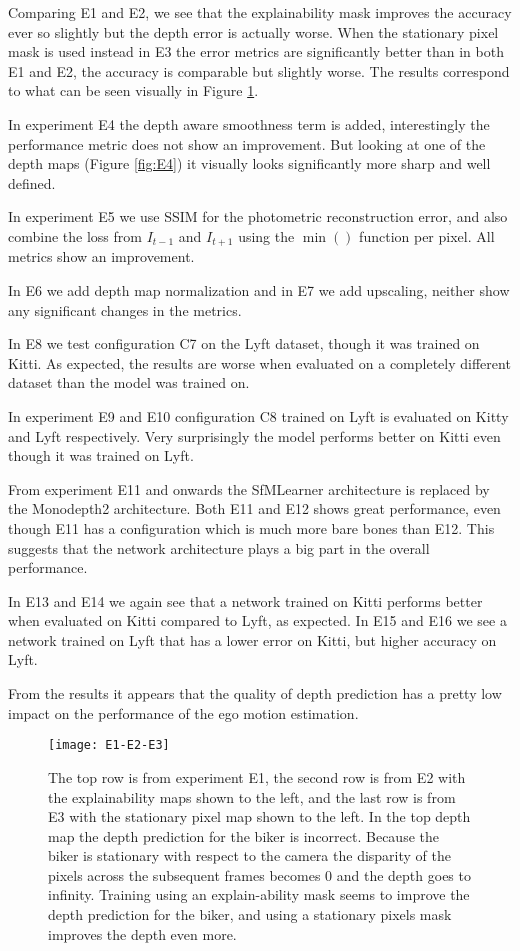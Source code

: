 Comparing E1 and E2, we see that the explainability mask improves the accuracy ever so slightly but the depth error is actually worse. When the stationary pixel mask is used instead in E3 the error metrics are significantly better than in both E1 and E2, the accuracy is comparable but slightly worse. The results correspond to what can be seen visually in Figure \ref{fig:e1e2e3}.

In experiment E4 the depth aware smoothness term is added, interestingly the performance metric does not show an improvement. But looking at one of the depth maps (Figure \ref{fig:E4}) it visually looks significantly more sharp and well defined.

In experiment E5 we use SSIM for the photometric reconstruction error, and also combine the loss from $I_{t-1}$ and $I_{t+1}$ using the $\min()$ function per pixel. All metrics show an improvement.

In E6 we add depth map normalization and in E7 we add upscaling, neither show any significant changes in the metrics.

In E8 we test configuration C7 on the Lyft dataset, though it was trained on Kitti. As expected, the results are worse when evaluated on a completely different dataset than the model was trained on.

In experiment E9 and E10 configuration C8 trained on Lyft is evaluated on Kitty and Lyft respectively. Very surprisingly the model performs better on Kitti even though it was trained on Lyft.

From experiment E11 and onwards the SfMLearner architecture is replaced by the Monodepth2 architecture. Both E11 and E12 shows great performance, even though E11 has a configuration which is much more bare bones than E12. This suggests that the network architecture plays a big part in the overall performance.

In E13 and E14 we again see that a network trained on Kitti performs better when evaluated on Kitti compared to Lyft, as expected. In E15 and E16 we see a network trained on Lyft that has a lower error on Kitti, but higher accuracy on Lyft.

From the results it appears that the quality of depth prediction has a pretty low impact on the performance of the ego motion estimation.

\begin{figure}[H]
	\centering
	\texttt{[image: E1-E2-E3]}
	\caption{The top row is from experiment E1, the second row is from E2 with the explainability maps shown to the left, and the last row is from E3 with the stationary pixel map shown to the left. In the top depth map the depth prediction for the biker is incorrect. Because the biker is stationary with respect to the camera the disparity of the pixels across the subsequent frames becomes 0 and the depth goes to infinity. Training using an explain-ability mask seems to improve the depth prediction for the biker, and using a stationary pixels mask improves the depth even more.}
	\label{fig:e1e2e3}
\end{figure}

